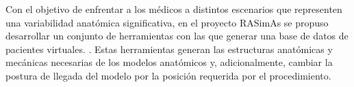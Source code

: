Con el objetivo de enfrentar a los médicos a distintos escenarios que representen una variabilidad anatómica significativa, en el proyecto \ac{RASimAs} se propuso desarrollar un conjunto de herramientas con las que generar una base de datos de pacientes virtuales. . 
%
Estas herramientas generan las estructuras anatómicas y mecánicas  necesarias de los modelos anatómicos y, adicionalmente, cambiar la postura de llegada del modelo por la posición requerida por el procedimiento.








